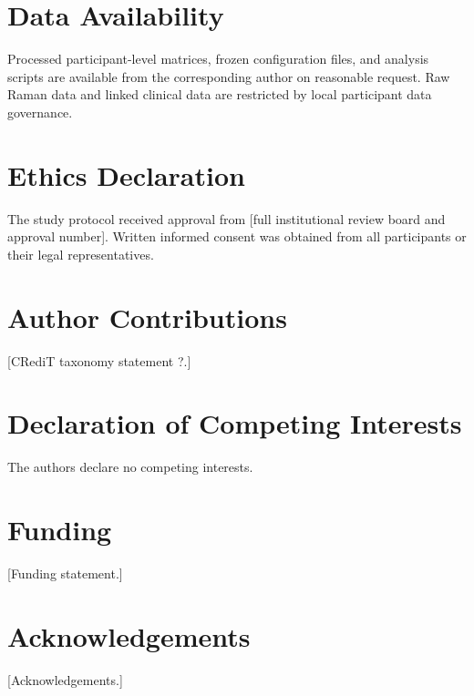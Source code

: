 \documentclass[preprint,12pt]{elsarticle}
\begin{document}
\section*{Data Availability}

Processed participant-level matrices, frozen configuration files, and analysis scripts are available from the corresponding author on reasonable request. Raw Raman data and linked clinical data are restricted by local participant data governance. 

\section*{Ethics Declaration}

The study protocol received approval from {\color{red}[full institutional review board and approval number]}. Written informed consent was obtained from all participants or their legal representatives.

\section*{Author Contributions}

{\color{red}[CRediT taxonomy statement ?.]}

\section*{Declaration of Competing Interests}

The authors declare no competing interests.

\section*{Funding}

{\color{red}[Funding statement.]}

\section*{Acknowledgements}

{\color{red}[Acknowledgements.]}

 
\end{document}
